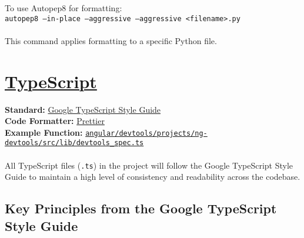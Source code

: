 \documentclass{article}
\begin{document}
To use Autopep8 for formatting:\\
\texttt{autopep8 --in-place --aggressive --aggressive <filename>.py}\\\\
This command applies formatting to a specific Python file.

\newpage{}

\section*{\href{https://github.com/microsoft/TypeScript}{TypeScript}}

\textbf{Standard:} \href{https://google.github.io/styleguide/tsguide.html}{Google TypeScript Style Guide} \\
\textbf{Code Formatter:} \href{https://github.com/prettier/prettier}{Prettier} \\
\textbf{Example Function:} \texttt{\href{https://github.com/angular/angular/blob/main/devtools/projects/ng-devtools/src/lib/devtools_spec.ts}{angular/devtools/projects/ng-devtools/src/lib/devtools\_spec.ts}} \\\\
All TypeScript files (\texttt{.ts}) in the project will follow the Google TypeScript Style Guide to maintain a high level of consistency and readability across the codebase.

\subsection*{Key Principles from the Google TypeScript Style Guide}
\end{document}
